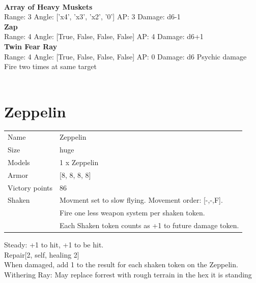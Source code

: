 \ \\
{\bf Array of Heavy Muskets } \\



Range: 3  Angle: ['x4', 'x3', 'x2', '0'] AP: 3 Damage: d6-1 \\




{\bf Zap } \\



Range: 4  Angle: [True, False, False, False] AP: 4 Damage: d6+1 \\




{\bf Twin Fear Ray } \\



Range: 4  Angle: [True, False, False, False] AP: 0 Damage: d6 Psychic damage \\
Fire two times at same target\\ 




 
\ \\














\clearpage

\section{ Zeppelin }

\begin{tabular}{ll}
  Name & Zeppelin \\
  Size & huge\\
  Models & 1 x Zeppelin\\
  Armor & [8, 8, 8, 8]\\
  Victory points & 86\\
  Shaken & Movment set to slow flying. Movement order: [-,-,F]. \ \\ &Fire one less weapon system per shaken token. \ \\ &Each Shaken token counts as +1 to future damage token.\\
\end{tabular}

Steady: +1 to hit, +1 to be hit.\\ 
Repair[2, self, healing 2]\\ 
 When damaged, add 1 to the result for each shaken token on the Zeppelin.\\ 
Withering Ray: May replace forrest with rough terrain in the hex it is standing\\ 



